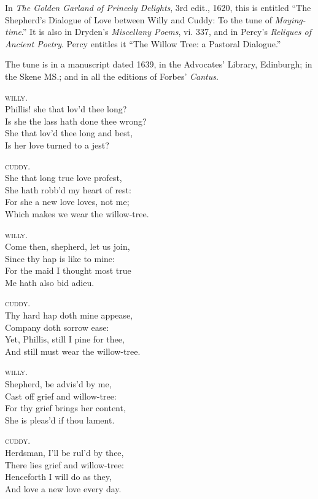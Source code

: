 
In \textit{The Golden Garland of Princely Delights}, 3rd edit., 1620, this is entitled
“The Shepherd’s Dialogue of Love between Willy and Cuddy: To the tune of
\textit{Maying-time}.” It is also in Dryden’s \textit{Miscellany Poems}, vi. 337, and in Percy’s
\textit{Reliques of Ancient Poetry}. Percy entitles it “The Willow Tree: a Pastoral
Dialogue.”

The tune is in a manuscript dated 1639, in the Advocates’ Library, Edinburgh;
in the Skene MS.; and in all the editions of Forbes’ \textit{Cantus}.



\begin{dcverse}\qquad\qquad\qquad \textsc{willy.}\\
Phillis! she that lov’d thee long?\\
Is she the lass hath done thee wrong?\\
She that lov’d thee long and best,\\
Is her love turned to a jest?

\qquad\qquad\qquad \textsc{cuddy}.\\
She that long true love profest,\\
She hath robb’d my heart of rest:\\
For she a new love loves, not me;\\
Which makes we wear the willow-tree.

\qquad\qquad\qquad \textsc{willy}.\\
Come then, shepherd, let us join,\\
Since thy hap is like to mine:\\
For the maid I thought most true\\
Me hath also bid adieu.

\qquad\qquad\qquad \textsc{cuddy}.\\
Thy hard hap doth mine appease,\\
Company doth sorrow ease:\\
Yet, Phillis, still I pine for thee,\\
And still must wear the willow-tree.

\qquad\qquad\qquad \textsc{willy}.\\
Shepherd, be advis’d by me,\\
Cast off grief and willow-tree:\\
For thy grief brings her content,\\
She is pleas’d if thou lament.

\qquad\qquad\qquad \textsc{cuddy}.\\
Herdsman, I’ll be rul’d by thee,\\
There lies grief and willow-tree:\\
Henceforth I will do as they,\\
And love a new love every day.
\end{dcverse}
\pagebreak%

